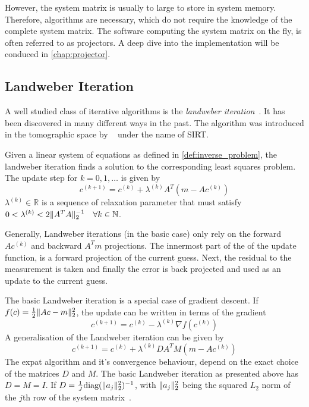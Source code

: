 However, the system matrix is usually to large to store in system memory. Therefore, algorithms are
necessary, which do not require the knowledge of the complete system matrix. The software computing
the system matrix on the fly, is often referred to as projectors. A deep dive into the
implementation will be conduced in \autoref{chap:projector}.

\subsection{Landweber Iteration}\label{subsec:landweber_iteration}

A well studied class of iterative algorithms is the \textit{landweber
	iteration}~\cite{landweber_iteration_1951}. It has been discovered in many different ways in
the past. The algorithm was introduced in the tomographic space by
\citeauthor{gilbert_iterative_1972}~\cite{gilbert_iterative_1972} under the name of
\gls{SIRT}.

\begin{definition}\label{def:landweber_iteration}
	Given a linear system of equations as defined in \autoref{def:inverse_problem}, the
	landweber iteration finds a solution to the corresponding least squares problem. The update
	step for \(k = 0, 1, \dots\) is given by
	\[
		c^{(k+1)} = c^{(k)} + \lambda^{(k)} A^T(m - Ac^{(k)})
	\]
	\(\lambda^{(k)} \in \mathbb{R}\) is a sequence of relaxation parameter that must satisfy
	\(0 < \lambda^{(k)} < 2 \norm{A^T A}_2^{-1}\quad \forall k \in \mathbb{N}\).
\end{definition}

Generally, Landweber iterations (in the basic case) only rely on the forward \(Ac^{(k)}\) and backward
\(A^T m\) projections. The innermost part of the of the update function, is a forward projection of the
current guess. Next, the residual to the measurement is taken and finally the error is back
projected and used as an update to the current guess.

The basic Landweber iteration is a special case of gradient descent. If \(f(c) = \frac{1}{2}
\lVert Ac - m\rVert_2^2\), the update can be written in terms of the gradient
\[
	c^{(k+1)} = c^{(k)} - \lambda^{(k)} \nabla f(c^{(k)})
\]
A generalisation of the Landweber iteration can be given by
\[
	c^{(k+1)} = c^{(k)} + \lambda^{(k)} DA^TM(m - Ac^{(k)})
\]
The expat algorithm and it's convergence behaviour, depend on the exact choice of the matrices \(D\)
and \(M\). The basic Landweber iteration as presented above has \(D = M = I\). If \(D = \frac{1}{J}
\text{diag}(\lVert a_j\rVert^2_2)^{-1}\), with \(\lVert a_j\rVert^2_2\) being the squared \(L_2\) norm of the
\(j\)th row of the system matrix~\cite[chap 6.2]{hansen_discrete_2010}.

